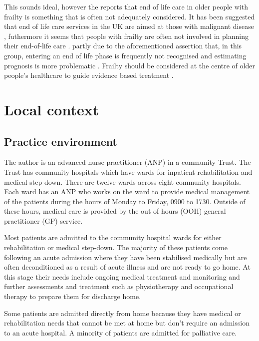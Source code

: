 \documentclass
[
	12pt,
	a4paper,
	oneside,
]{report}
\begin{document}
This sounds ideal, however the \textcite{silver:12} reports that end of life care 
in older people with frailty
is something that is often not adequately considered. It has been suggested that 
end of life care services in the UK are aimed at those with malignant 
disease \parencite{sharp:13}, futhermore it seems that people with frailty 
are often not involved in planning their 
end-of-life care \textcite{oliver:14}. partly due to the aforementioned assertion 
that, in this group, entering an end of life phase is frequently not recognised 
\textcite{wallington:16} and
estimating prognosis is more problematic \parencite{silver:12}.
Frailty should be considered at the centre of older people's healthcare to guide
evidence based treatment \parencite{woo:14}.

\section{Local context}

\subsection{Practice environment}

The author is an advanced nurse practitioner (ANP) in a community Trust.
The Trust has community hospitals which have wards for inpatient rehabilitation and
medical step-down. There are twelve wards across eight community hospitals. Each ward has
an ANP who works on the ward to provide medical management of the patients during 
the hours of Monday to Friday, 0900 to 1730. Outside of these hours, medical care 
is provided by the out of hours (OOH) general practitioner (GP) service. 

Most patients are admitted to the community hospital wards for either rehabilitation
or medical step-down. The majority of these patients come following an acute admission
where they have been stabilised medically but are often deconditioned as a result
of acute illness and are not ready to go home. At this stage their needs include 
ongoing medical treatment and monitoring and further assessments and treatment such 
as physiotherapy and occupational therapy to prepare them for discharge home.

Some patients are admitted directly from home because they have medical or rehabilitation
needs that cannot be met at home but don't require an admission to an acute hospital.
A minority of patients are admitted for palliative care.
\end{document}
